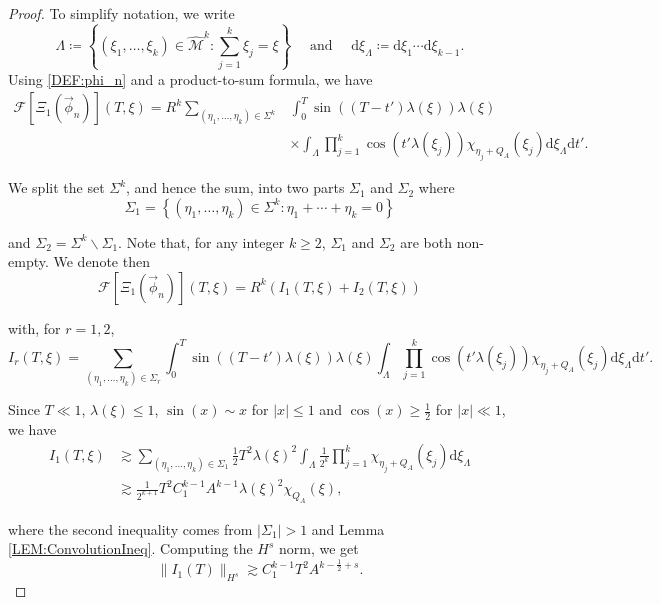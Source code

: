 \documentclass[letterpaper, 11pt,  reqno]{amsart}
\newcommand{\1}{\hspace{0.5mm}\text{I}\hspace{0.5mm}}
\newcommand{\noi}{\noindent}
\newcommand{\M}{\mathcal{M}}
\newcommand{\F}{\mathcal{F}}
\newcommand{\ld}{\lambda}
\newcommand{\Ld}{\Lambda}
\newcommand{\Si}{\Sigma}
\newcommand{\ges}{\gtrsim}
\numberwithin{equation}{section}
\numberwithin{theorem}{section}
\newcommand{\abs}[1]{\lvert#1\rvert}
\begin{document}
\begin{proof}
To simplify notation, we write
$$
\Ld \coloneqq \left\{ (\xi_1, \dots, \xi_k) \in \widehat{\M}^k \colon \sum^k_{j=1} \xi_j = \xi \right\} \quad \text{ and } \quad \mathrm{d}\xi_\Ld \coloneqq \mathrm{d}\xi_1 \cdots \mathrm{d}\xi_{k-1}.
$$
Using \eqref{DEF:phi_n} and a product-to-sum formula, we have
\begin{align*}
\F[ \Xi_1 (\vec{\phi}_n)] (T, \xi) = R^k \sum\limits_{(\eta_1, \dots, \eta_k) \in \Si^k} & \int^T_0 \sin((T - t') \ld(\xi)) \ld(\xi) \\
	& \times\int_\Ld \prod^k_{j=1} \cos(t' \ld(\xi_j)) \chi_{\eta_j + Q_A} (\xi_j) \mathrm{d}\xi_\Ld \mathrm{d}t'.
\end{align*}

\noi We split the set $\Si^k$, and hence the sum, into two parts $\Si_1$ and $\Si_2$ where
$$
\Si_1 = \left\{ (\eta_1, \dots, \eta_k) \in \Si^k \colon \eta_1+ \cdots +\eta_k = 0 \right\}
$$

\noi and $\Si_2 = \Si^k \backslash \Si_1$. Note that, for any integer $k \geq 2$, $\Si_1$ and $\Si_2$ are both non-empty. We denote then
\begin{equation}
\label{EQ:ProofSecondPicardSplit}
\F[ \Xi_1 (\vec{\phi}_n)] (T, \xi) = R^k \left( I_1 (T, \xi) + I_2 (T,\xi) \right)
\end{equation}

\noi with, for $r = 1,2$,
$$
I_r (T, \xi) = \sum\limits_{(\eta_1, \dots, \eta_k) \in \Si_r} \int^T_0 \sin((T - t') \ld(\xi)) \ld(\xi) \int_\Ld \prod^k_{j=1} \cos(t' \ld(\xi_j)) \chi_{\eta_j + Q_A} (\xi_j) \mathrm{d}\xi_\Ld \mathrm{d}t'.
$$

Since $T \ll 1$, $\ld(\xi) \leq 1$, $\sin(x) \sim x$ for $\abs{x} \leq 1$ and $\cos(x) \geq \frac 12$ for $\abs{x} \ll 1$, we have
\begin{align*}
I_1 (T, \xi) & \ges \sum\limits_{(\eta_1, \dots, \eta_k) \in \Si_1} \frac 12 T^2 \ld(\xi)^2 \int_\Ld \frac{1}{2^k} \prod^k_{j=1} \chi_{\eta_j + Q_A}(\xi_j) \mathrm{d}\xi_\Ld \\
	& \ges \frac{1}{2^{k+1}} T^2 C^{k-1}_1 A^{k-1} \ld(\xi)^2 \chi_{Q_A} (\xi),
\end{align*}

\noi where the second inequality comes from $\abs{\Si_1} > 1$ and Lemma \ref{LEM:ConvolutionIneq}. Computing the $H^s$ norm, we get
\begin{equation}
\label{EQ:PicardSecondLowFreq}
\| I_1(T) \|_{H^s} \ges C^{k-1}_1 T^2 A^{k - \frac 12 + s}.
\end{equation}


\end{proof}
\end{document}

